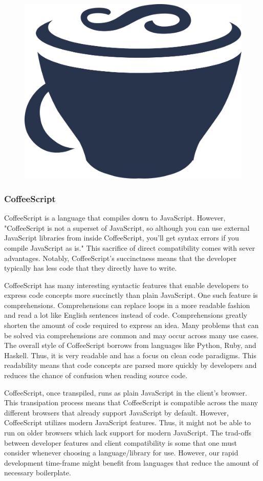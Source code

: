 \documentclass[12pt]{report}
\begin{document}
\begin{figure}[h]
	\centering
	\includegraphics[width=0.25\linewidth]{coffeescript}
\end{figure}

\subsubsection*{CoffeeScript}

CoffeeScript is a language that compiles down to JavaScript.\cite{coffeescriptlittlebook} However, "CoffeeScript is not a superset of JavaScript, so although you can use external JavaScript libraries from inside CoffeeScript, you'll get syntax errors if you compile JavaScript as is."\cite{coffeescriptlittlebook} This sacrifice of direct compatibility comes with sever advantages. Notably, CoffeeScript's succinctness means that the developer typically has less code that they directly have to write.

CoffeeScript has many interesting syntactic features that enable developers to express code concepts more succinctly than plain JavaScript. One such feature is comprehensions.\cite{coffeescriptguide} Comprehensions can replace loops in a more readable fashion and read a lot like English sentences instead of code. Comprehensions greatly shorten the amount of code required to express an idea. Many problems that can be solved via comprehensions are common and may occur across many use cases. The overall style of CoffeeScript borrows from languages like Python, Ruby, and Haskell. Thus, it is very readable and has a focus on clean code paradigms. This readability means that code concepts are parsed more quickly by developers and reduces the chance of confusion when reading source code.

CoffeeScript, once transpiled, runs as plain JavaScript in the client's browser.\cite{coffeescriptguide} This transipation process means that CoffeeScript is compatible across the many different browsers that already support JavaScript by default. However, CoffeeScript utilizes modern JavaScript features.\cite{coffeescriptguide} Thus, it might not be able to run on older browsers which lack support for modern JavaScript. The trad-offs between developer features and client compatibility is some that one must consider whenever choosing a language/library for use. However, our rapid development time-frame might benefit from languages that reduce the amount of necessary boilerplate.
\end{document}
